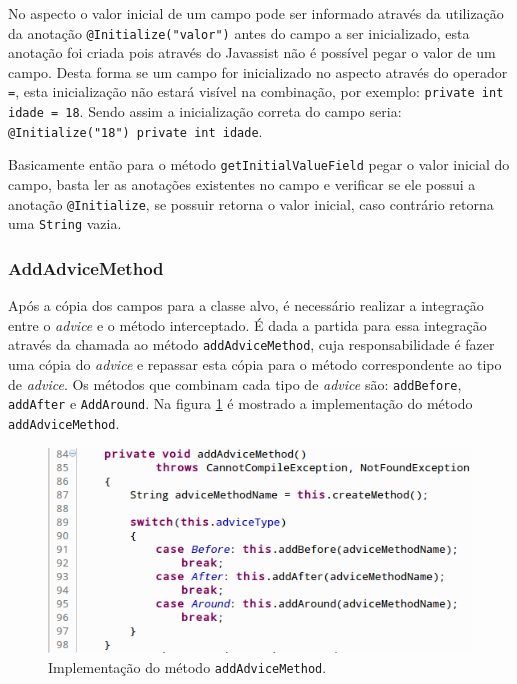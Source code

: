 \documentclass[tc,oneside]{iiufrgs}
\begin{document}
No aspecto o valor inicial de um campo pode ser informado através da utilização da anotação \texttt{@Initialize("valor")} antes do campo a ser inicializado, esta anotação foi criada pois através do Javassist não é possível pegar o valor de um campo. Desta forma se um campo for inicializado no aspecto através do operador \texttt{=}, esta inicialização não estará visível na combinação, por exemplo: \texttt{private int idade = 18}. Sendo assim a inicialização correta do campo seria: \texttt{@Initialize("18") private int idade}.

Basicamente então para o método \texttt{getInitialValueField} pegar o valor inicial do campo, basta ler as anotações existentes no campo e verificar se ele possui a anotação \texttt{@Initialize}, se possuir retorna o valor inicial, caso contrário retorna uma \texttt{String} vazia.

\subsubsection{AddAdviceMethod}

Após a cópia dos campos para a classe alvo, é necessário realizar a integração entre o \textit{advice} e o método interceptado. É dada a partida para essa integração através da chamada ao método \texttt{addAdviceMethod}, cuja responsabilidade é fazer uma cópia do \textit{advice} e repassar esta cópia para o método correspondente ao tipo de \textit{advice}. Os métodos que combinam cada tipo de \textit{advice} são: \texttt{addBefore}, \texttt{addAfter} e \texttt{AddAround}. Na figura \ref{fig:addadvicemethod} é mostrado a implementação do método \texttt{addAdviceMethod}.

\begin{figure}[ht]
	\centering
	\includegraphics[scale=0.5]{figuras/implementacao/addadvicemethod.png}
	\caption{Implementação do método \texttt{addAdviceMethod}.}
	\label{fig:addadvicemethod}
\end{figure}
\end{document}
